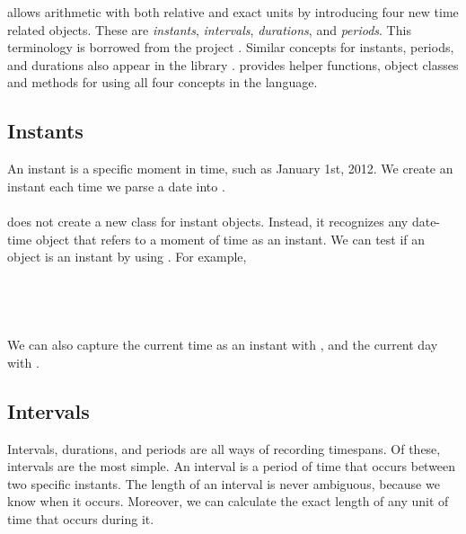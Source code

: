 \documentclass[article]{jss}
\begin{document}
 allows arithmetic with both relative and exact units by introducing four new time related objects. These are \emph{instants}, \emph{intervals}, \emph{durations}, and \emph{periods}. This terminology is borrowed from the  project \citep{jodatime}. Similar concepts for instants, periods, and durations also appear in the  library  \citep{boost}.  provides helper functions, object classes and methods for using all four concepts in the  language.

\subsection{Instants}
\label{sec:instants}

An instant is a specific moment in time, such as January 1st, 2012. We create an instant each time we parse a date into . \\

\\

 does not create a new class for instant objects. Instead, it recognizes any date-time object that refers to a moment of time as an instant. We can test if an object is an instant by using . For example,\\

\\
\\

\\
\\

We can also capture the current time as an instant with , and the current day with .



\subsection{Intervals}
\label{sec:intervals}

Intervals, durations, and periods are all ways of recording timespans. Of these, intervals are the most simple. An interval is a period of time that occurs between two specific instants. The length of an interval is never ambiguous, because we know when it occurs. Moreover, we can calculate the exact length of any unit of time that occurs during it. 
\end{document}
